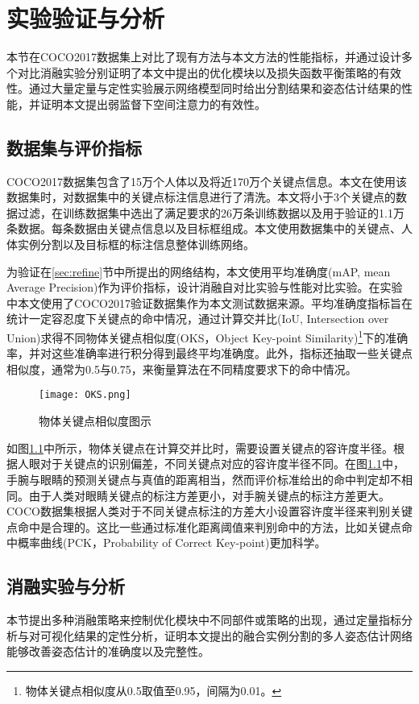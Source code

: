 \chapter{实验验证与分析}
\label{cha:exp}
本节在COCO2017数据集上对比了现有方法与本文方法的性能指标，并通过设计多个对比消融实验分别证明了本文中提出的优化模块以及损失函数平衡策略的有效性。通过大量定量与定性实验展示网络模型同时给出分割结果和姿态估计结果的性能，并证明本文提出弱监督下空间注意力的有效性。
\section{数据集与评价指标}
\label{sec:dataset}
COCO2017数据集\cite{lin2014microsoft}包含了15万个人体以及将近170万个关键点信息。本文在使用该数据集时，对数据集中的关键点标注信息进行了清洗。本文将小于3个关键点的数据过滤，在训练数据集中选出了满足要求的26万条训练数据以及用于验证的1.1万条数据。每条数据由关键点信息以及目标框组成。本文使用数据集中的关键点、人体实例分割以及目标框的标注信息整体训练网络。

为验证在\ref{sec:refine}节中所提出的网络结构，本文使用平均准确度(mAP, mean Average Precision)\cite{zhu2004recall}作为评价指标，设计消融自对比实验与性能对比实验。在实验中本文使用了COCO2017验证数据集作为本文测试数据来源。平均准确度指标旨在统计一定容忍度下关键点的命中情况，通过计算交并比(IoU, Intersection over Union)求得不同物体关键点相似度(OKS，Object Key-point Similarity)\footnote{物体关键点相似度从0.5取值至0.95，间隔为0.01。}下的准确率，并对这些准确率进行积分得到最终平均准确度\cite{ruggero2017benchmarking}。此外，指标还抽取一些关键点相似度，通常为0.5与0.75，来衡量算法在不同精度要求下的命中情况。

\begin{figure}
	\centering
	\texttt{[image: OKS.png]}
	\caption{物体关键点相似度图示\cite{ruggero2017benchmarking}}
	\label{fig:oksfigure}
\end{figure}

如图\ref{fig:oksfigure}中所示，物体关键点在计算交并比时，需要设置关键点的容许度半径。根据人眼对于关键点的识别偏差，不同关键点对应的容许度半径不同。在图\ref{fig:oksfigure}中，手腕与眼睛的预测关键点与真值的距离相当，然而评价标准给出的命中判定却不相同。由于人类对眼睛关键点的标注方差更小，对手腕关键点的标注方差更大。COCO数据集根据人类对于不同关键点标注的方差大小设置容许度半径来判别关键点命中是合理的。这比一些通过标准化距离阈值来判别命中的方法，比如关键点命中概率曲线\cite{andriluka20142d}(PCK，Probability of Correct Key-point)更加科学。

\section{消融实验与分析}
\label{sec:ablation}
本节提出多种消融策略来控制优化模块中不同部件或策略的出现，通过定量指标分析与对可视化结果的定性分析，证明本文提出的融合实例分割的多人姿态估计网络能够改善姿态估计的准确度以及完整性。
